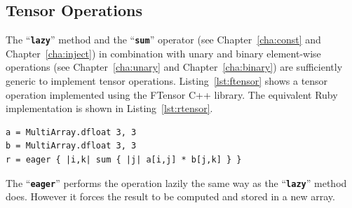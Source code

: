 \documentclass[12pt,a4paper,oneside,openright]{book}
\newcommand{\cha}[1]{Chapter~\ref{cha:#1}}
\newcommand{\lst}[1]{Listing~\ref{lst:#1}}
\newcommand{\code}[1]{``\texttt{\textbf{\textcolor{codegray}{\small{#1}}}}''}
\begin{document}
\begin{CJK}{UTF8}{}
\subsection{Tensor Operations}\label{cha:tensor}
The \code{lazy} method and the \code{sum} operator (see \cha{const} and \cha{inject}) in combination with unary and binary element-wise operations (see \cha{unary} and \cha{binary}) are sufficiently generic to implement tensor operations. \lst{ftensor} shows a tensor operation implemented using the FTensor C++ library. The equivalent Ruby implementation is shown in \lst{rtensor}.
\lstset{language=Ruby,frame=single,numbers=none}
\begin{lstlisting}[float,caption={Tensor operations in Ruby (equivalent to \lst{ftensor})},label=lst:rtensor]
a = MultiArray.dfloat 3, 3
b = MultiArray.dfloat 3, 3
r = eager { |i,k| sum { |j| a[i,j] * b[j,k] } }
\end{lstlisting}
The \code{eager} performs the operation lazily the same way as the \code{lazy} method does. However it forces the result to be computed and stored in a new array.


\end{CJK}
\end{document}
